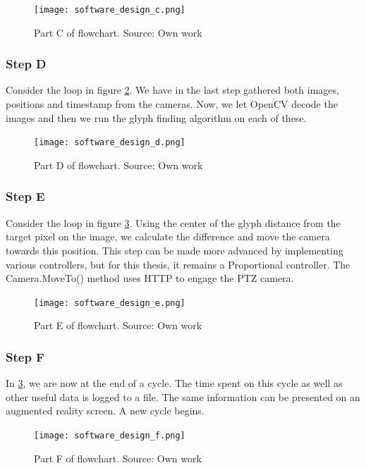 \begin{figure}[ht]
    \centering
    \texttt{[image: software\_design\_c.png]}
    \caption{Part C of flowchart. Source: Own work}
    \label{fig:software_design_c}
\end{figure}
\FloatBarrier


\subsubsection{Step D}
Consider the loop in figure \ref{fig:software_design_d}. We have in the last step gathered both images, positions and timestamp from the cameras. Now, we let OpenCV decode the images and then we run the glyph finding algorithm on each of these.
\begin{figure}[ht]
    \centering
    \texttt{[image: software\_design\_d.png]}
    \caption{Part D of flowchart. Source: Own work}
    \label{fig:software_design_d}
\end{figure}
\FloatBarrier

\subsubsection{Step E}
Consider the loop in figure \ref{fig:software_design_e}. Using the center of the glyph distance from the target pixel on the image, we calculate the difference and move the camera towards this position. This step can be made more advanced by implementing various controllers, but for this thesis, it remains a Proportional controller. The Camera.MoveTo() method uses HTTP to engage the PTZ camera.
\begin{figure}[ht]
    \centering
    \texttt{[image: software\_design\_e.png]}
    \caption{Part E of flowchart. Source: Own work}
    \label{fig:software_design_e}
\end{figure}
\FloatBarrier

\subsubsection{Step F}
In \ref{fig:software_design_e}, we are now at the end of a cycle. The time spent on this cycle as well as other useful data is logged to a file. The same information can be presented on an augmented reality screen. A new cycle begins.
\begin{figure}[ht]
    \centering
    \texttt{[image: software\_design\_f.png]}
    \caption{Part F of flowchart. Source: Own work}
    \label{fig:software_design_f}
\end{figure}
\FloatBarrier


